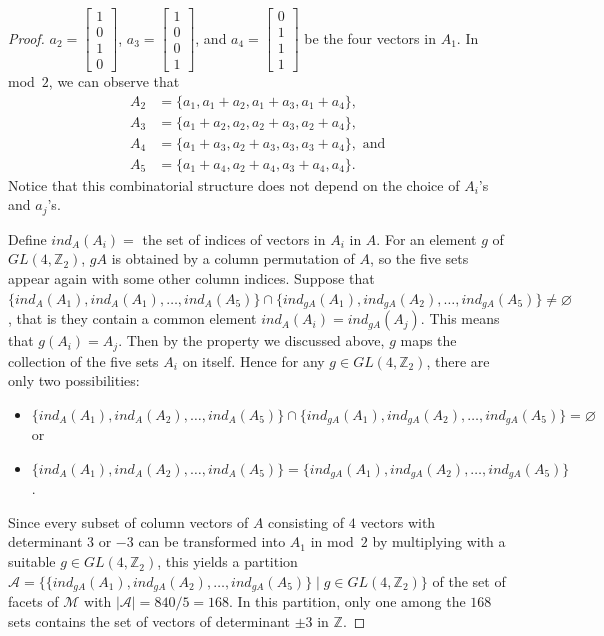 \documentclass[11pt]{amsart}
\theoremstyle{plain}
\numberwithin{equation}{section}
\theoremstyle{definition}
\newcommand{\Z}{\mathbb{Z}}
\newcommand{\cM}{\mathcal{M}}
\newcommand{\cA}{\mathcal{A}}
\begin{document}
\begin{proof}
    $a_2 = \begin{bmatrix}
    	1 \\
    	0 \\
    	1 \\
    	0
    \end{bmatrix}$, 
    $a_3 = \begin{bmatrix}
    	1 \\
    	0 \\
    	0 \\
    	1
    \end{bmatrix}$, and 
    $a_4 = \begin{bmatrix}
    	0 \\
    	1 \\
    	1 \\
    	1
    \end{bmatrix}$
    be the four vectors in $A_1$.
    In mod~$2$, we can observe that \begin{align*}
    	A_2 &= \{a_1, a_1+a_2, a_1+a_3, a_1+a_4 \}, \\
    	A_3 &= \{a_1 + a_2, a_2, a_2+a_3, a_2+a_4 \}, \\
    	A_4 &= \{a_1 + a_3, a_2 + a_3, a_3, a_3+a_4\}, \text{ and } \\
    	A_5 &= \{a_1 + a_4, a_2 + a_4, a_3+a_4, a_4 \}.
    \end{align*}
    Notice that this combinatorial structure does not depend on the choice of $A_i$'s and $a_j$'s.

    Define $ind_A(A_i) = $ the set of indices of vectors in $A_i$ in $A$.
    For an element $g$ of $GL(4, \Z_2)$, $gA$ is obtained by a column permutation of $A$, so the five sets appear again with some other column indices.
    Suppose that $\{ind_A(A_1), ind_A(A_1), \ldots, ind_A(A_5)\} \cap \{ind_{gA}(A_1), ind_{gA}(A_2), \ldots, ind_{gA}(A_5)\} \not= \varnothing$, that is they contain a common element $ind_A(A_i) = ind_{gA}(A_j)$.
    This means that $g(A_i) = A_j$.
    Then by the property we discussed above, $g$ maps the collection of the five sets $A_i$ on itself.
    Hence for any $g \in GL(4, \Z_2)$, there are only two possibilities:
    \begin{itemize}
    	\item $\{ind_A(A_1), ind_A(A_2), \ldots, ind_A(A_5)\} \cap \{ind_{gA}(A_1), ind_{gA}(A_2), \ldots, ind_{gA}(A_5)\} = \varnothing$ or
    	\item $\{ind_A(A_1), ind_A(A_2), \ldots, ind_A(A_5)\} = \{ind_{gA}(A_1), ind_{gA}(A_2), \ldots, ind_{gA}(A_5)\}$.
    \end{itemize}
    Since every subset of column vectors of $A$ consisting of $4$ vectors with determinant $3$ or $-3$ can be transformed into $A_1$ in mod~$2$ by multiplying with a suitable $g \in GL(4, \Z_2)$, this yields a partition $\cA = \{\{ind_{gA}(A_1), ind_{gA}(A_2), \ldots, ind_{gA}(A_5)\} \mid g \in GL(4, \Z_2) \}$ of the set of facets of $\cM$ with $|\cA| = 840/5 =168$.
    In this partition, only one among the $168$ sets contains the set of vectors of determinant $\pm 3$ in $\Z$.


\end{proof}
\end{document}
